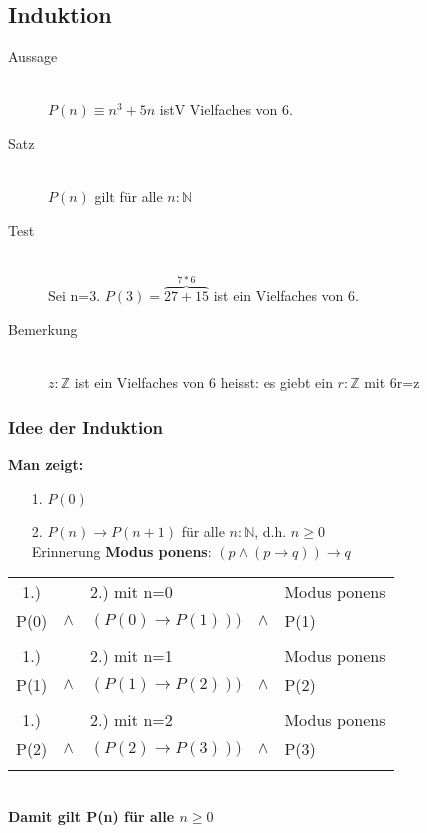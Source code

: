 \documentclass[a4paper,10pt]{article}
\newcommand{\NN}{\mathbb{N}} %
\newcommand{\ZN}{\mathbb{Z}} %
\newcommand{\Bold}[1]{\textbf{#1}} %
\newcommand{\ra}{\rightarrow}
\begin{document}
\subsection{Induktion}
\begin{description}
	\item[Aussage] \hfill \\
		$P(n) \equiv n^3 +5n$ istV Vielfaches von 6.
	\item[Satz] \hfill \\
		$P(n)$ gilt für alle $n:\NN$
	\item[Test] \hfill \\
		Sei n=3. $P(3) = \overbrace{27+15}^{7*6}$ ist ein Vielfaches von 6.
	\item[Bemerkung] \hfill \\
		$z:\ZN$ ist ein Vielfaches von 6 heisst: es giebt ein $r:\ZN$ mit 6r=z
\end{description}

\subsubsection{Idee der Induktion}
\Bold {Man zeigt:}
\begin{itemize}
	\item[1.] $P(0)$
	\item[2.] $P(n) \ra P(n+1)$ für alle $n:\NN$, d.h. $n\geq 0$ \\
		Erinnerung \Bold {Modus ponens}: $(p \wedge (p \ra q))\ra q$
\end{itemize}
\begin{tabular}{ c c l c l}
1.) & & 2.) mit n=0 & & Modus ponens \\
P(0) & $\wedge$ & $(P(0) \ra P(1)))$ & $\wedge$ & P(1) \\ \\
1.) & & 2.) mit n=1 & & Modus ponens \\
P(1) & $\wedge$ & $(P(1) \ra P(2)))$ & $\wedge$ & P(2) \\ \\
1.) & & 2.) mit n=2 & & Modus ponens \\
P(2) & $\wedge$ & $(P(2) \ra P(3)))$ & $\wedge$ & P(3) \\ \\
\end{tabular} \\
\Bold {Damit gilt P(n) für alle $n \geq 0$}
\end{document}
